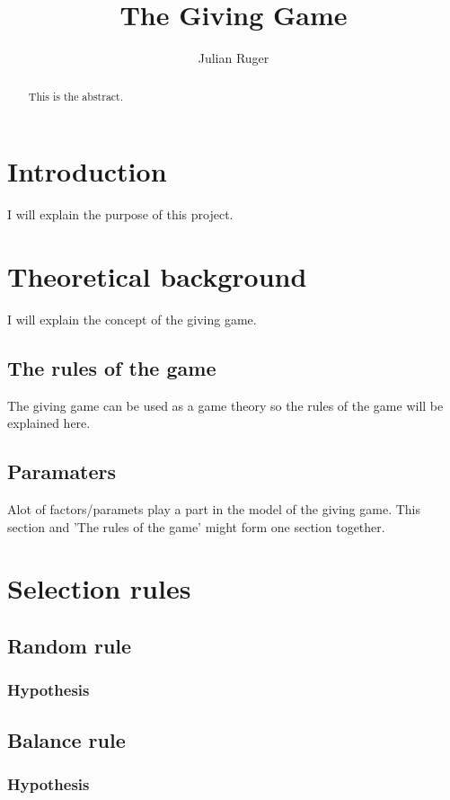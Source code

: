 \documentclass[twoside,openright]{uva-bachelor-thesis}
\title{The Giving Game}
\author{Julian Ruger}
\begin{document}
\maketitle

\begin{abstract}
This is the abstract. 
\end{abstract}

\tableofcontents

\chapter{Introduction}
I will explain the purpose of this project.

\chapter{Theoretical background}
I will explain the concept of the giving game.

\section{The rules of the game}
The giving game can be used as a game theory so the rules of the game will be explained here.

\section{Paramaters}
Alot of factors/paramets play a part in the model of the giving game. This section and 'The rules of the game' might form one section together.

\chapter{Selection rules}
\section{Random rule}

\subsection{Hypothesis}

\section{Balance rule}

\subsection{Hypothesis}
\end{document}
